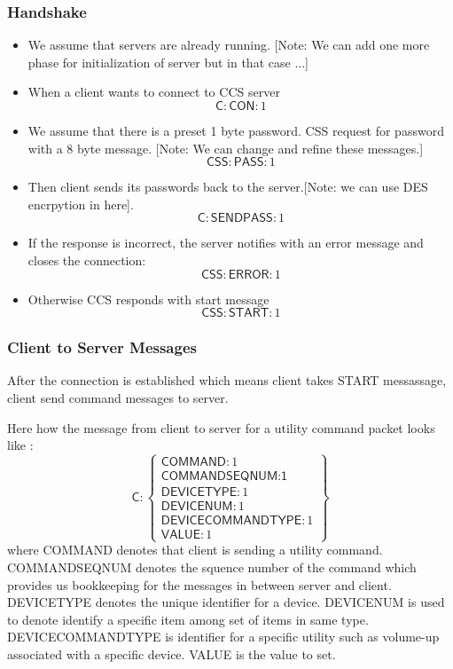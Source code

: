 \subsubsection{Handshake}
\label{sec:pdus:pdu:hs}
\begin{itemize}
\item We assume that servers are already running. [Note: We can add one more phase for initialization of server but in that case ...]
\item When a client wants to connect to \textsf{CCS} server
  \[ \textsf{C} : \textsf{CON} : 1\]
\item We assume that there is a preset 1 byte password. \textsf{CSS} request for password with a 8 byte message. [Note: We can change and refine these messages.]
  \[\textsf{CSS} : \textsf{PASS} : 1\]
  \item Then client sends its passwords back to the server.[Note: we can use DES encrpytion in here]. 
    \[\textsf{C} : \textsf{SENDPASS} : 1\]
  \item If the response is incorrect, the server notifies with an error message and closes the connection:
    \[\textsf{CSS}:\textsf{ERROR}:1\]
    \item Otherwise \textsf{CCS} responds with start message
      \[\textsf{CSS} : \textsf{START} : 1\]
    \end{itemize}

\subsubsection{Client to Server Messages}
\label{sec:pdus:pdu:c_to_s}

After the connection is established which means client takes \textsf{START} messassage, client send command messages to server. 

Here how the message from client to server for a utility command packet looks like :
\[
\textsf{C}:\left\{ \begin{array}{ll}  \textsf{COMMAND}:1\\
                                      \textsf{COMMANDSEQNUM:1}\\
                                      \textsf{DEVICETYPE}:1 \\
                                       \textsf{DEVICENUM}:1 \\
                                      \textsf{DEVICECOMMANDTYPE}:1 \\
                                        \textsf{VALUE}:1

           \end{array} \right\}
\]                                        
where \textsf{COMMAND} denotes that client is sending a utility command. \textsf{COMMANDSEQNUM} denotes the squence number of the command which provides us bookkeeping for the messages in between server and client. \textsf{DEVICETYPE} denotes the unique identifier for a device. \textsf{DEVICENUM} is used to denote identify a specific item among set of items in same type. \textsf{DEVICECOMMANDTYPE} is identifier for a specific utility such as volume-up associated with a specific device. \textsf{VALUE} is the value to set.


